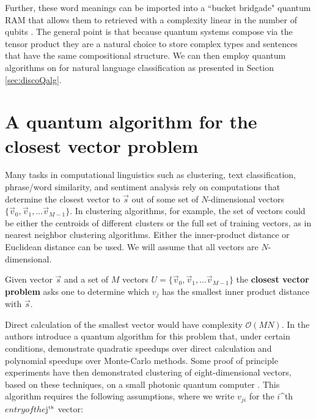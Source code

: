 Further, these word meanings can be imported into a ``bucket bridgade" quantum RAM that allows them to retrieved with a complexity linear in the number of qubits \cite{giovannetti2008quantum}. The general point is that because quantum systems compose via the tensor product they are a natural choice to store complex types and sentences that have the same compositional structure. We can then employ quantum algorithms on for natural language classification as presented in Section \ref{sec:discoQalg}.

\section{A quantum algorithm for the closest vector problem}
\label{sec:qalg}

Many tasks in computational linguistics such as clustering, text classification, phrase/word similarity, and sentiment analysis rely on computations that determine the closest vector to $\vec{s}$ out of some set of $N$-dimensional vectors $\{\vec{v}_0,\vec{v}_1,...\vec{v}_{M-1}\}$. In clustering algorithms, for example, the set of vectors could be either the centroids of different clusters or the full set of training vectors, as in nearest neighbor clustering algorithms. Either the inner-product distance or Euclidean distance can be used. We will assume that all vectors are $N$-dimensional.
\begin{definition}
Given vector $\vec{s}$ and a set of $M$ vectors $U = \{\vec{v}_0,\vec{v}_1,...\vec{v}_{M-1}\}$ the \textbf{closest vector problem} asks one to determine which $v_j$ has the smallest inner product distance with $\vec{s}$.
\end{definition}
Direct calculation of the smallest vector would have complexity $\mathcal{O}(MN)$.  In \cite{wiebe2014quantum} the authors introduce a quantum algorithm for this problem that, under certain conditions, demonstrate quadratic speedups over direct calculation and polynomial speedups over Monte-Carlo methods. Some proof of principle experiments have then demonstrated clustering of eight-dimensional vectors, based on these techniques, on a small photonic quantum computer \cite{cai2015entanglement}. This algorithm requires the following assumptions, where we write $v_{ji}$ for the $i$^{\tiny\mbox{th}}$ entry of the $j$^{\tiny\mbox{th}}$ vector:
